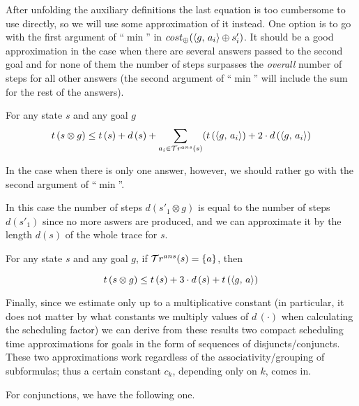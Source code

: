 After unfolding the auxiliary definitions the last equation is too cumbersome to use directly,
so we will use some approximation of it instead.
One option is to go with the first argument of ``$\min$'' in $cost_{\oplus}(\langle g ,\, a_i \rangle \oplus s'_i)$.
It should be a good approximation in the case when there are several answers passed to the second
goal and for none of them the number of steps surpasses the \emph{overall} number of steps for all
other answers (the second argument of ``$\min$'' will include the sum for the rest of the answers).

\begin{corollary}
\label{lem:prod_estimation_multiple_answers}
For any state $s$ and any goal $g$
\[ t\,(s \otimes g) \le t\,(s) + d\,(s) + \displaystyle\sum\limits_{a_i \in \mathcal{T}r^{ans}(s)} (t\,(\langle g ,\, a_i \rangle) + 2\cdot d\,(\langle g ,\, a_i \rangle) \]
\end{corollary}

In the case when there is only one answer, however, we should rather go with the second argument of ``$\min$''. 

In this case the number of steps $d(s'_1 \otimes g)$ is equal to the number of steps $d(s'_1)$
since no more aswers are produced, and we can approximate it by the length $d(s)$ of the whole
trace for $s$. 

\begin{corollary}
\label{lem:prod_estimation_single_answer}
  For any state $s$ and any goal $g$, if $\mathcal{T}r^{ans}(s) = \{a\}$, then
  
\[ t\,(s \otimes g) \le t\,(s) + 3\cdot d\,(s) + t\,(\langle g ,\, a \rangle) \]
\end{corollary}

Finally, since we estimate only up to a multiplicative constant (in particular, it does not matter by what constants we multiply values of $d\,(\cdot)$ when calculating
the scheduling factor) we can derive from these results two compact scheduling time approximations for goals in the form of sequences of disjuncts/conjuncts.
These two approximations work regardless of the associativity/grouping of subformulas; thus a certain constant $c_k$, depending only on $k$, comes in.

For conjunctions, we have the following one.

